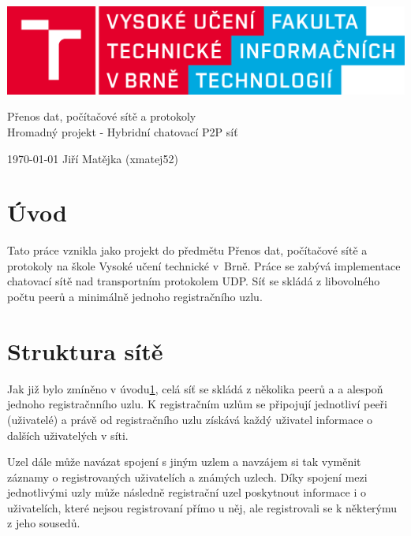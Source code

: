 \documentclass[11pt,a4paper,titlepage]{article}
\begin{document}
		\begin{center}

			\includegraphics[width = 150mm]{logo.png}\\


			\LARGE
			Přenos dat, počítačové sítě a protokoly\\
			Hromadný projekt - Hybridní chatovací P2P síť\\

		\end{center}

	\Large{\today} \hfill Jiří Matějka (xmatej52)
	\thispagestyle{empty}
	\newpage
	\setcounter{page}{1}

    \tableofcontents
	\newpage
	\newpage

    \section{Úvod} \label{uvod}
        Tato práce vznikla jako projekt do předmětu Přenos dat, počítačové sítě a protokoly na škole
		Vysoké učení technické v~Brně. Práce se zabývá implementace chatovací sítě nad transportním protokolem
        UDP. Síť se skládá z libovolného počtu peerů a minimálně jednoho registračního uzlu.

	\section{Struktura sítě} \label{struktura}
		Jak již bylo zmíněno v úvodu\ref{uvod}, celá síť se skládá z několika peerů a
        a alespoň jednoho registračnního uzlu. K registračním uzlům se připojují jednotliví peeři (uživatelé)
        a právě od registračního uzlu získává každý uživatel informace o dalších uživatelých v síti.

        Uzel dále může navázat spojení s jiným uzlem a navzájem si tak vyměnit záznamy o
        registrovaných uživatelích a známých uzlech. Díky spojení mezi jednotlivými uzly
        může následně registrační uzel poskytnout informace i o uživatelích, které nejsou
        registrovaní přímo u něj, ale registrovali se k některýmu z jeho sousedů.
\end{document}
